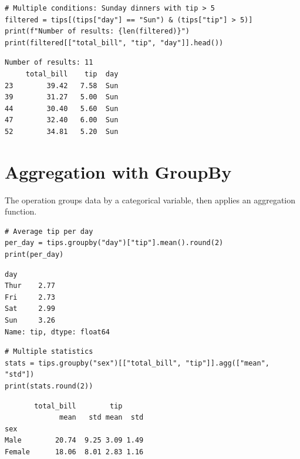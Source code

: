 \begin{codeblock}[title=\textbf{Python}]
\begin{verbatim}
# Multiple conditions: Sunday dinners with tip > 5
filtered = tips[(tips["day"] == "Sun") & (tips["tip"] > 5)]
print(f"Number of results: {len(filtered)}")
print(filtered[["total_bill", "tip", "day"]].head())
\end{verbatim}
\end{codeblock}

\begin{codeoutput}
\begin{verbatim}
Number of results: 11
     total_bill    tip  day
23        39.42   7.58  Sun
39        31.27   5.00  Sun
44        30.40   5.60  Sun
47        32.40   6.00  Sun
52        34.81   5.20  Sun
\end{verbatim}
\end{codeoutput}

\section{Aggregation with GroupBy}

The  operation groups data by a categorical variable,
then applies an aggregation function.

\begin{codeblock}[title=\textbf{Python}]
\begin{verbatim}
# Average tip per day
per_day = tips.groupby("day")["tip"].mean().round(2)
print(per_day)
\end{verbatim}
\end{codeblock}

\begin{codeoutput}
\begin{verbatim}
day
Thur    2.77
Fri     2.73
Sat     2.99
Sun     3.26
Name: tip, dtype: float64
\end{verbatim}
\end{codeoutput}

\begin{codeblock}[title=\textbf{Python}]
\begin{verbatim}
# Multiple statistics
stats = tips.groupby("sex")[["total_bill", "tip"]].agg(["mean", "std"])
print(stats.round(2))
\end{verbatim}
\end{codeblock}

\begin{codeoutput}
\begin{verbatim}
       total_bill        tip
             mean   std mean  std
sex
Male        20.74  9.25 3.09 1.49
Female      18.06  8.01 2.83 1.16
\end{verbatim}
\end{codeoutput}

